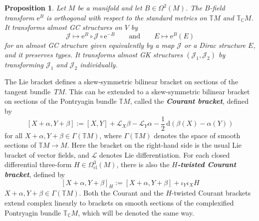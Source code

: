 \documentclass[pdftex]{sigma}
\newtheorem{Proposition}[Theorem]{Proposition}
\numberwithin{equation}{section}
\newcommand{\deff}[1]{\textbf{\emph{#1}}}
\newcommand{\pont}[1]{\mathbb{T} {#1}}
\newcommand{\cpont}[1]{\mathbb{T}_{\mathbb{C}} {#1}}
\newcommand{\tang}{T}
\begin{document}
\begin{Proposition}
Let $M$ be a manifold and let $B \in \Omega^2(M)$.
The $B$-field transform $\mathrm{e}^B$ is orthogonal with respect to the standard metrics on $\pont{M}$ and $\cpont{M}$.
It transforms almost GC structures on $V$ by
\[
  \mathcal{J} \mapsto \mathrm{e}^B \circ \mathcal{J} \circ \mathrm{e}^{-B}
  \qquad \text{and} \qquad
   E \mapsto \mathrm{e}^B(E)
\]
for an almost GC structure given equivalently by a map $\mathcal{J}$ or a Dirac structure $E$, and it preserves types.  It transforms almost GK structures $(\mathcal{J}_1,\mathcal{J}_2)$ by transforming $\mathcal{J}_1$ and $\mathcal{J}_2$ individually.
\end{Proposition}


The Lie bracket def\/ines a skew-symmetric bilinear bracket on sections of the tangent bund\-le~$\tang M$.  This can be extended to a skew-symmetric bilinear bracket on sections of the Pontryagin bundle $\pont{M}$, called the \deff{Courant bracket}, def\/ined by
  \[
    [ X+\alpha, Y+\beta ]
    :=
    [X,Y] + \mathcal{L}_X \beta - \mathcal{L}_Y \alpha
    - \frac{1}{2} \, \mathrm{d} \left( \beta(X) - \alpha(Y) \right)
  \]
for all $X+\alpha, Y+\beta \in \Gamma(\pont{M})$, where $\Gamma(\pont{M})$ denotes the space of smooth sections of $\pont{M} \to M$.
Here the bracket on the right-hand side is the usual Lie bracket of vector f\/ields, and $\mathcal{L}$ denotes Lie dif\/ferentiation. For each closed dif\/ferential three-form $H \in \Omega_{\text{cl}}^3(M)$, there is also the \deff{$H$-twisted Courant bracket}, def\/ined by
  \[
    [ X+\alpha, Y+\beta ]_H
    :=
    [ X+\alpha, Y+\beta ]
    + \iota_Y \iota_X H
  \]
$X+\alpha, Y+\beta \in \Gamma(\pont{M})$.
Both the Courant and the $H$-twisted Courant brackets extend complex linearly to brackets on smooth sections of the complexif\/ied Pontryagin bundle $\cpont{M}$, which will be denoted the same way.
\end{document}
